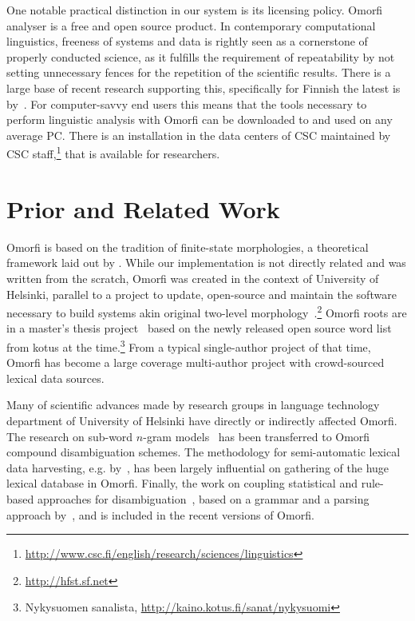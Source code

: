 \documentclass[a4paper,12pt]{article}
\begin{document}
One notable practical distinction in our system is its licensing policy. Omorfi
analyser is a free and open source product.  In contemporary computational
linguistics, freeness of systems and data is rightly seen as a cornerstone of
properly conducted science, as it fulfills the requirement of repeatability by
not setting unnecessary fences for the repetition of the scientific results.
There is a large base of recent research supporting this, specifically for
Finnish the latest is by~\citet{koskenniemi2008build}. For computer-savvy end
users this means that the tools necessary to perform linguistic analysis with
Omorfi can be downloaded to and used on any average PC. There is an
installation in the data centers of CSC maintained by CSC
staff,\footnote{\url{http://www.csc.fi/english/research/sciences/linguistics}}
that is available for researchers.

\section{Prior and Related Work}
\label{sec:prior-work}

Omorfi is based on the tradition of finite-state morphologies, a theoretical
framework laid out by \citet{koskenniemi1983twolevel}. While our implementation
is not directly related and was written from the scratch, Omorfi was created in
the context of University of Helsinki, parallel to a project to update,
open-source and maintain the software necessary to build systems akin original
two-level morphology~\citep{hfst2012}.\footnote{\url{http://hfst.sf.net}}
Omorfi roots are in a master's thesis project~\citep{pirinen2008suomen} based
on the newly released open source word list from kotus at the
time.\footnote{Nykysuomen sanalista,
\url{http://kaino.kotus.fi/sanat/nykysuomi}} From a typical single-author
project of that time, Omorfi has  become a large coverage multi-author
project with crowd-sourced lexical data sources.

Many of scientific advances made by research groups in language technology
department of University of Helsinki have directly or indirectly affected
Omorfi. The research on sub-word \(n\)-gram
models~\citep{pirinen2009weighted,pirinen2009weighting} has been transferred
to Omorfi compound disambiguation schemes. The methodology for
semi-automatic lexical data harvesting, e.g.
by~\citet{linden2008probabilistic}, has been largely influential on
gathering of the huge lexical database in Omorfi. Finally, the work on
coupling statistical and rule-based approaches for
disambiguation~\citep{pirinen2015using}, based on a grammar and a parsing
approach by~\citet{karlsson1995constraint}, and is included in the recent
versions of Omorfi.
\end{document}
